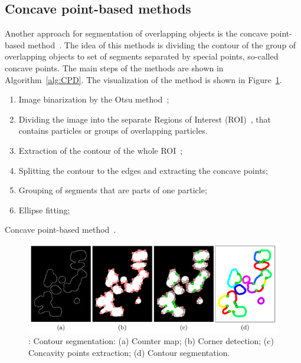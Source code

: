 \documentclass{lutmscthesis}[2010/09/22]
\begin{document}
\subsection{Concave point-based methods}
Another approach for segmentation of overlapping objects is the concave point-based method~\cite{compare-cpd,Saddik,Zafari15}. The idea of this methods is dividing the contour of the group of overlapping objects to set of segments separated by special points, so-called concave points. The main steps of the methods are shown in Algorithm~\ref{alg:CPD}. The visualization of the method is shown in Figure~\ref{fig:Contour-segmentation}.

\begin{algorithm} [H]
    \begin{enumerate}
        \item Image binarization by the Otsu method~\cite{otsu};
        \item Dividing the image into the separate Regions of Interest (ROI)~, that contains particles or groups of overlapping particles.
        \item Extraction of the contour of the whole ROI~\cite{ROI};
        \item Splitting the contour to the edges and extracting the concave points;
        \item Grouping of segments that are parts of one particle;
        \item Ellipse fitting;
    \end{enumerate}
    \caption{Concave point-based method~\cite{Zafari15}.}\label{alg:CPD}
\end{algorithm}

\begin{figure} [ht]
  \includegraphics[width=\linewidth]{concave_points.png}
  \caption{: Contour segmentation: 
    (a) Counter map; 
    (b) Corner detection; 
    (c) Concavity points extraction;
    (d) Contour segmentation.~\cite{Zafari15}}
  \label{fig:Contour-segmentation}
\end{figure}
\end{document}
